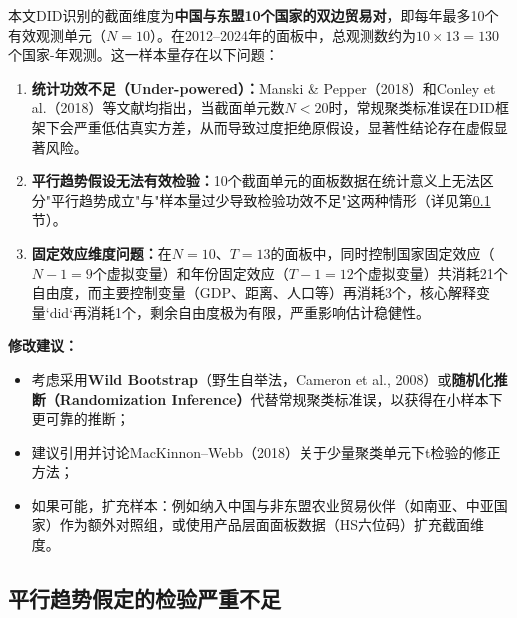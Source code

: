 \documentclass[12pt, a4paper]{article}
\begin{document}
\begin{criticalbox}

本文DID识别的截面维度为\textbf{中国与东盟10个国家的双边贸易对}，即每年最多10个有效观测单元（$N=10$）。在2012--2024年的面板中，总观测数约为$10 \times 13 = 130$个国家-年观测。这一样本量存在以下问题：

\begin{enumerate}[label=\arabic*)]
  \item \textbf{统计功效不足（Under-powered）：}Manski \& Pepper（2018）和Conley et al.（2018）等文献均指出，当截面单元数$N < 20$时，常规聚类标准误在DID框架下会严重低估真实方差，从而导致过度拒绝原假设，显著性结论存在虚假显著风险。

  \item \textbf{平行趋势假设无法有效检验：}10个截面单元的面板数据在统计意义上无法区分"平行趋势成立"与"样本量过少导致检验功效不足"这两种情形（详见第\ref{sec:parallel_trends}节）。

  \item \textbf{固定效应维度问题：}在$N=10$、$T=13$的面板中，同时控制国家固定效应（$N-1=9$个虚拟变量）和年份固定效应（$T-1=12$个虚拟变量）共消耗21个自由度，而主要控制变量（GDP、距离、人口等）再消耗3个，核心解释变量`did`再消耗1个，剩余自由度极为有限，严重影响估计稳健性。
\end{enumerate}

\textbf{修改建议：}
\begin{itemize}
  \item 考虑采用\textbf{Wild Bootstrap}（野生自举法，Cameron et al., 2008）或\textbf{随机化推断（Randomization Inference）}代替常规聚类标准误，以获得在小样本下更可靠的推断；
  \item 建议引用并讨论MacKinnon–Webb（2018）关于少量聚类单元下t检验的修正方法；
  \item 如果可能，扩充样本：例如纳入中国与非东盟农业贸易伙伴（如南亚、中亚国家）作为额外对照组，或使用产品层面面板数据（HS六位码）扩充截面维度。
\end{itemize}
\end{criticalbox}

\subsection{平行趋势假定的检验严重不足}
\label{sec:parallel_trends}
\end{document}
